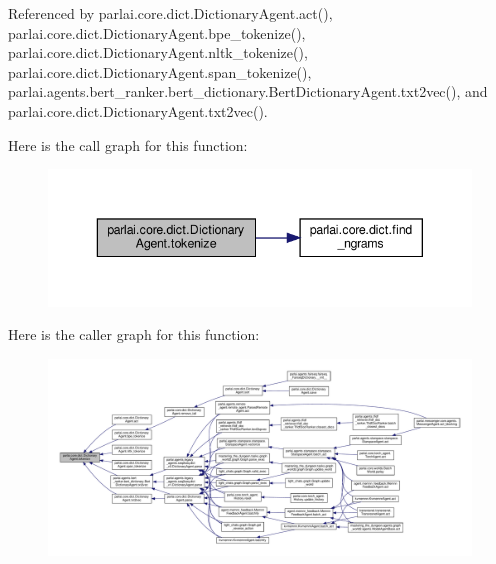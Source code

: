 Referenced by parlai.\+core.\+dict.\+Dictionary\+Agent.\+act(), parlai.\+core.\+dict.\+Dictionary\+Agent.\+bpe\+\_\+tokenize(), parlai.\+core.\+dict.\+Dictionary\+Agent.\+nltk\+\_\+tokenize(), parlai.\+core.\+dict.\+Dictionary\+Agent.\+span\+\_\+tokenize(), parlai.\+agents.\+bert\+\_\+ranker.\+bert\+\_\+dictionary.\+Bert\+Dictionary\+Agent.\+txt2vec(), and parlai.\+core.\+dict.\+Dictionary\+Agent.\+txt2vec().

Here is the call graph for this function\+:
\nopagebreak
\begin{figure}[H]
\begin{center}
\leavevmode
\includegraphics[width=343pt]{classparlai_1_1core_1_1dict_1_1DictionaryAgent_aca7e5edfd6502701277cb83b75ff4e96_cgraph}
\end{center}
\end{figure}
Here is the caller graph for this function\+:
\nopagebreak
\begin{figure}[H]
\begin{center}
\leavevmode
\includegraphics[width=350pt]{classparlai_1_1core_1_1dict_1_1DictionaryAgent_aca7e5edfd6502701277cb83b75ff4e96_icgraph}
\end{center}
\end{figure}
\mbox{\label{classparlai_1_1core_1_1dict_1_1DictionaryAgent_abc3baf742422fc7cdaece698224709d4}} 
